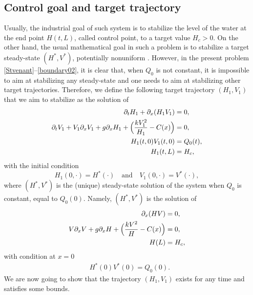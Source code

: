 \documentclass[JEP,XML,SOM,Unicode]{cedram}
\theoremstyle{definition}
\begin{document}
\subsection{Control goal and target trajectory}
Usually, the industrial goal of such system is to stabilize the level of the water at the end point $H(t,L)$, called control point, to a target value $H_{c}>0$.
On the other hand, the usual mathematical goal in such a problem is to stabilize a target steady-state $(H^{*},V^{*})$, potentially nonuniform \cite[Preface]{BastinCoron1D}. However, in the present problem \eqref{Stvenant}--\eqref{boundary02}, it is clear that, when $Q_{0}$
is not constant, it is impossible to aim at stabilizing any steady-state and one needs to aim at stabilizing other target trajectories.
Therefore, we define the following target trajectory $(H_{1},V_{1})$ that we aim to stabilize as the solution of
\begin{equation}\label{target}
\begin{split}
\partial_{t}H_{1}+\partial_{x}(H_{1}V_{1})&=0,\\
\partial_{t}V_{1}+V_{1}\partial_{x}V_{1}+g\partial_{x}H_{1}+\Bigl(\frac{kV_{1}^{2}}{H_{1}}-C(x)\Bigr)&=0,\\
H_{1}(t,0)V_{1}(t,0)&=Q_{0}(t),\\
H_{1}(t,L)&=H_{c},
\end{split}
\end{equation}
with the initial condition
\begin{equation}\label{initialtarget}
H_{1}(0,\cdot)=H^{*}(\cdot)\quad\text{and}\quad V_{1}(0,\cdot)=V^{*}(\cdot),
\end{equation}
where $(H^{*},V^{*})$ is the (unique) steady-state solution of the system {when $Q_{0}$ is} constant, equal to $Q_{0}(0)$. Namely, $(H^{*},V^{*})$ is the solution of
\begin{equation}
\label{targetsteady0}
\begin{split}
\partial_{x}(HV)&=0,\\
V\partial_{x}V+g\partial_{x}H+\Bigl(\frac{kV^{2}}{H}-C(x)\Bigr)&=0,\\
H(L)&=H_{c},
\end{split}
\end{equation}
with condition at $x=0$
\begin{equation}
\begin{split}
&H^{*}(0)V^{*}(0)=Q_{0}(0).
\end{split}
\label{targetsteady}
\end{equation}
We are now going to show that the trajectory $(H_{1},V_{1})$ exists for any time and satisfies some bounds.
\end{document}
